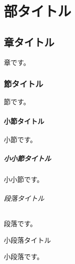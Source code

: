\documentclass{ltjsreport}
\begin{document}
\part{部タイトル}
\chapter{章タイトル}
章です。
\section{節タイトル}
節です。
\subsection{小節タイトル}
小節です。
\subsubsection{小小節タイトル}
小小節です。
\paragraph{段落タイトル}
段落です。
\subparagraph{小段落タイトル}
小段落です。
\end{document}
